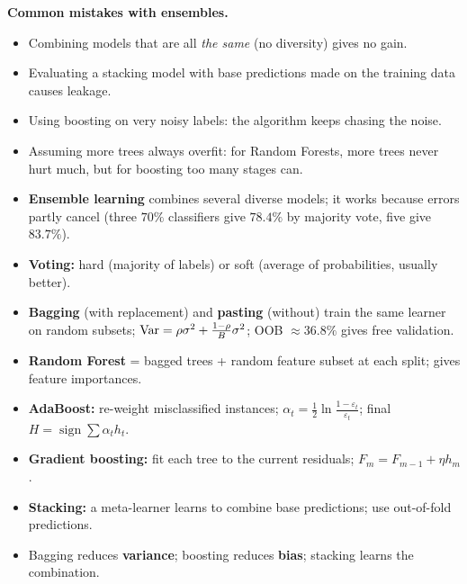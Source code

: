 \begin{warning}
\textbf{Common mistakes with ensembles.}
\begin{itemize}
  \item Combining models that are all \emph{the same} (no diversity) gives no gain.
  \item Evaluating a stacking model with base predictions made on the training data causes leakage.
  \item Using boosting on very noisy labels: the algorithm keeps chasing the noise.
  \item Assuming more trees always overfit: for Random Forests, more trees never hurt much, but for boosting too many stages can.
\end{itemize}
\end{warning}

\begin{summary}
\begin{itemize}
  \item \textbf{Ensemble learning} combines several diverse models; it works because errors partly cancel (three $70\%$ classifiers give $78.4\%$ by majority vote, five give $83.7\%$).
  \item \textbf{Voting:} hard (majority of labels) or soft (average of probabilities, usually better).
  \item \textbf{Bagging} (with replacement) and \textbf{pasting} (without) train the same learner on random subsets; $\operatorname{Var}=\rho\sigma^2+\frac{1-\rho}{B}\sigma^2$; OOB $\approx36.8\%$ gives free validation.
  \item \textbf{Random Forest} = bagged trees + random feature subset at each split; gives feature importances.
  \item \textbf{AdaBoost:} re-weight misclassified instances; $\alpha_t=\frac12\ln\frac{1-\varepsilon_t}{\varepsilon_t}$; final $H=\operatorname{sign}\sum\alpha_th_t$.
  \item \textbf{Gradient boosting:} fit each tree to the current residuals; $F_m=F_{m-1}+\eta h_m$.
  \item \textbf{Stacking:} a meta-learner learns to combine base predictions; use out-of-fold predictions.
  \item Bagging reduces \textbf{variance}; boosting reduces \textbf{bias}; stacking learns the combination.
\end{itemize}
\end{summary}

